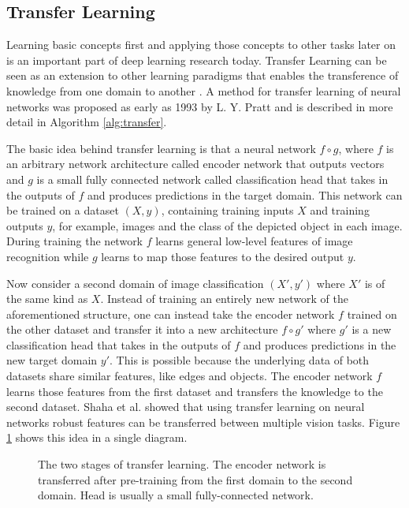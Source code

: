 \subsection{Transfer Learning}

Learning basic concepts first and applying those concepts to other tasks later on is an important part of deep learning research today. Transfer Learning can be seen as an extension to other learning paradigms that enables the transference of knowledge from one domain to another \cite{yang_zhang_dai_pan_2020}. A method for transfer learning of neural networks was proposed as early as 1993 by L. Y. Pratt \cite{NIPS1992_641} and is described in more detail in Algorithm \ref{alg:transfer}.

The basic idea behind transfer learning is that a neural network $f \circ g$, where $f$ is an arbitrary network architecture called encoder network that outputs vectors and $g$ is a small fully connected network called classification head that takes in the outputs of $f$ and produces predictions in the target domain. This network can be trained on a dataset $(X,y)$, containing training inputs $X$ and training outputs $y$, for example, images and the class of the depicted object in each image. During training the network $f$ learns general low-level features of image recognition while $g$ learns to map those features to the desired output $y$.

Now consider a second domain of image classification $(X',y')$ where $X'$ is of the same kind as $X$. Instead of training an entirely new network of the aforementioned structure, one can instead take the encoder network $f$ trained on the other dataset and transfer it into a new architecture $f \circ g'$ where $g'$ is a new classification head that takes in the outputs of $f$ and produces predictions in the new target domain $y'$. This is possible because the underlying data of both datasets share similar features, like edges and objects. The encoder network $f$ learns those features from the first dataset and transfers the knowledge to the second dataset. Shaha et al. \cite{shaha2018transfer} showed that using transfer learning on neural networks robust features can be transferred between multiple vision tasks. Figure \ref{fig:transfer_learning} shows this idea in a single diagram.

\begin{figure}[t]
    \centering
    
    \caption[Transfer Learning Overview]{The two stages of transfer learning. The encoder network is transferred after pre-training from the first domain to the second domain. Head is usually a small fully-connected network.}
    \label{fig:transfer_learning}
\end{figure}

